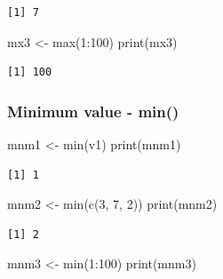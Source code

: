 \documentclass[
  letterpaper,
  DIV=11,
  numbers=noendperiod]{scrartcl}
\newenvironment{Shaded}{\begin{snugshade}}{\end{snugshade}}
\newcommand{\DecValTok}[1]{\textcolor[rgb]{0.68,0.00,0.00}{#1}}
\newcommand{\FunctionTok}[1]{\textcolor[rgb]{0.28,0.35,0.67}{#1}}
\newcommand{\NormalTok}[1]{\textcolor[rgb]{0.00,0.23,0.31}{#1}}
\newcommand{\OtherTok}[1]{\textcolor[rgb]{0.00,0.23,0.31}{#1}}
\newcommand{\SpecialCharTok}[1]{\textcolor[rgb]{0.37,0.37,0.37}{#1}}
\begin{document}
\begin{verbatim}
[1] 7
\end{verbatim}

\begin{Shaded}
\begin{Highlighting}[]
\NormalTok{mx3 }\OtherTok{\textless{}{-}} \FunctionTok{max}\NormalTok{(}\DecValTok{1}\SpecialCharTok{:}\DecValTok{100}\NormalTok{)}
\FunctionTok{print}\NormalTok{(mx3)}
\end{Highlighting}
\end{Shaded}

\begin{verbatim}
[1] 100
\end{verbatim}

\subsubsection{Minimum value - min()}\label{minimum-value---min}

\begin{Shaded}
\begin{Highlighting}[]
\NormalTok{mnm1 }\OtherTok{\textless{}{-}} \FunctionTok{min}\NormalTok{(v1)}
\FunctionTok{print}\NormalTok{(mnm1)}
\end{Highlighting}
\end{Shaded}

\begin{verbatim}
[1] 1
\end{verbatim}

\begin{Shaded}
\begin{Highlighting}[]
\NormalTok{mnm2 }\OtherTok{\textless{}{-}} \FunctionTok{min}\NormalTok{(}\FunctionTok{c}\NormalTok{(}\DecValTok{3}\NormalTok{, }\DecValTok{7}\NormalTok{, }\DecValTok{2}\NormalTok{))}
\FunctionTok{print}\NormalTok{(mnm2)}
\end{Highlighting}
\end{Shaded}

\begin{verbatim}
[1] 2
\end{verbatim}

\begin{Shaded}
\begin{Highlighting}[]
\NormalTok{mnm3 }\OtherTok{\textless{}{-}} \FunctionTok{min}\NormalTok{(}\DecValTok{1}\SpecialCharTok{:}\DecValTok{100}\NormalTok{)}
\FunctionTok{print}\NormalTok{(mnm3) }
\end{Highlighting}
\end{Shaded}
\end{document}
